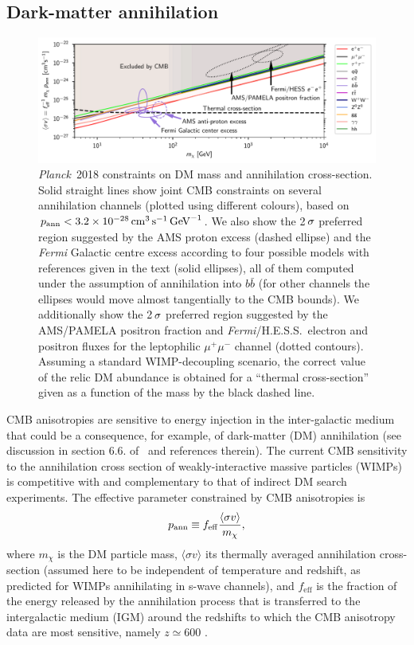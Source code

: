 \documentclass[longauth,traditabstract]{aa}
\def\Planck{\textit{Planck}}
\def\,{\thinspace}
\newcommand{\paramsII}{\citetalias{planck2014-a15}}
\begin{document}
\subsection{Dark-matter annihilation}\label{sec:ann}
\begin{figure}[htbp!]
\includegraphics[width=18cm]{ann_2col.pdf}
\caption{\Planck\ 2018 constraints on DM mass and annihilation cross-section.
Solid straight lines show joint CMB constraints on several annihilation channels (plotted using different colours), based on $p_{\rm ann} < 3.2 \times 10^{-28} \,{\rm cm}^3\,{\rm s}^{-1}\,{\rm GeV}^{-1}$.
We also show the 2$\,\sigma$ preferred region suggested by the AMS proton excess (dashed ellipse) and the {\it Fermi\/} Galactic centre excess according to four possible models with references given in the text (solid ellipses), all of them computed under the assumption of annihilation into $b\bar{b}$ (for other channels the ellipses would move almost tangentially to the CMB bounds). We additionally show the 2$\,\sigma$ preferred region suggested by the AMS/PAMELA positron fraction and {\it Fermi}/H.E.S.S.\ electron and positron fluxes for the leptophilic $\mu^+\mu^-$ channel (dotted contours). Assuming a standard WIMP-decoupling scenario, the correct value of the relic DM abundance is obtained for a ``thermal cross-section'' given as a function of the mass by the black dashed line.}
\label{fig:ann}
\end{figure}


CMB anisotropies are sensitive to energy injection in the
inter-galactic medium that could be a consequence, for example, of
dark-matter (DM) annihilation (see discussion in section
6.6. of \paramsII\ and references therein).
The current CMB sensitivity to the annihilation cross section of weakly-interactive massive particles (WIMPs) is competitive with and complementary to that of indirect DM search experiments.
The effective parameter constrained by CMB anisotropies is
\begin{equation}
p_{\rm ann} \equiv f_\mathrm{eff} \frac{\langle \sigma v \rangle}{m_\chi},
\end{equation}
where $m_\chi$ is the DM particle mass, $\langle \sigma v \rangle$ its
thermally averaged annihilation cross-section (assumed here to be
independent of temperature and redshift, as predicted for WIMPs
annihilating in s-wave channels), and $f_\mathrm{eff}$ is the fraction
of the energy released by the annihilation process that is transferred
to the intergalactic medium (IGM) around the redshifts to which the
CMB anisotropy data are most sensitive, namely $z \simeq
600$ \citep{Finkbeiner:2011dx}.
\end{document}
